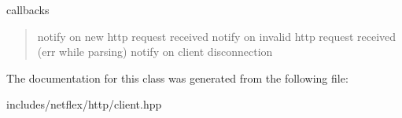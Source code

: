 callbacks \begin{quote}
notify on new http request received notify on invalid http request received (err while parsing) notify on client disconnection \end{quote}


The documentation for this class was generated from the following file\+:\begin{DoxyCompactItemize}
\item 
includes/netflex/http/client.\+hpp\end{DoxyCompactItemize}
